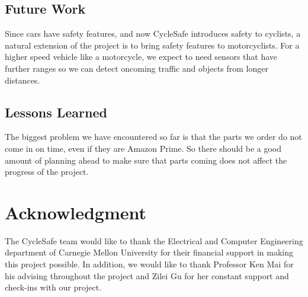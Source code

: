 \documentclass[journal]{IEEEtran}
\begin{document}
\subsection{Future Work}
Since cars have safety features, and now CycleSafe introduces safety to cyclists, a natural extension of the project is to bring safety features to motorcyclists. For a higher speed vehicle like a motorcycle, we expect to need sensors that have further ranges so we can detect oncoming traffic and objects from longer distances.

\subsection{Lessons Learned}
The biggest problem we have encountered so far is that the parts we order do not come in on time, even if they are Amazon Prime. So there should be a good amount of planning ahead to make sure that parts coming does not affect the progress of the project.

\section*{Acknowledgment}
The CycleSafe team would like to thank the Electrical and Computer Engineering department of Carnegie Mellon University for their financial support in making this project possible. In addition, we would like to thank Professor Ken Mai for his advising throughout the project
and Zilei Gu for her constant support and check-ins with our project.






\clearpage


\end{document}
